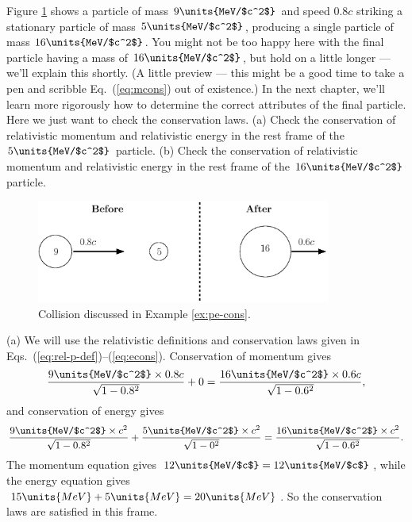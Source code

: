 \begin{example}{}
\label{ex:pe-cons}
Figure \ref{fig:junk} shows a particle of mass $9\units{MeV/$c^2$}$ and 
speed $0.8c$ striking a stationary particle of mass $5\units{MeV/$c^2$}$, 
producing a single particle of mass $16\units{MeV/$c^2$}$.
You might not be too happy here with the final particle having a mass
of $16\units{MeV/$c^2$}$, but hold on a little longer --- we'll
explain this shortly.  (A little preview --- this might be a good time
to take a pen and scribble Eq.~(\ref{eq:mcons}) out of existence.)  In
the next chapter, we'll learn more rigorously how to determine the
correct attributes of the final particle.  Here we just want to check
the conservation laws. (a) Check the conservation of relativistic
momentum and relativistic energy in the rest frame of the 
$5\units{MeV/$c^2$}$ particle.  (b) Check the conservation of
relativistic momentum and relativistic energy in the rest frame of the
$16\units{MeV/$c^2$}$ particle.
\begin{figure}[tb]
\begin{center}
\includegraphics[width=3.8in]{relativistic_momentum_and_energy/relpande3.eps}
\end{center}
\caption{Collision discussed in Example \ref{ex:pe-cons}.}
\label{fig:junk}
\end{figure}

\solution
(a) We will use the relativistic definitions and conservation laws given 
in Eqs.~(\ref{eq:rel-p-def})--(\ref{eq:econs}).  Conservation of momentum 
gives 
\begin{equation}
\frac{9\units{MeV/$c^2$}\times 0.8c}{\sqrt{1 - 0.8^2}} + 0 = 
\frac{16\units{MeV/$c^2$}\times 0.6c}{\sqrt{1 - 0.6^2}},
\end{equation}
and conservation of energy gives
\begin{equation}
\frac{9\units{MeV/$c^2$}\times c^2}{\sqrt{1 - 0.8^2}} 
 + \frac{5\units{MeV/$c^2$}\times c^2}{\sqrt{1 - 0^2}}= 
\frac{16\units{MeV/$c^2$}\times c^2}{\sqrt{1 - 0.6^2}}.
\end{equation}
The momentum equation gives $12\units{MeV/$c$} = 12\units{MeV/$c$}$, 
while the energy equation gives $15\units{MeV} + 5\units{MeV} = 20\units{MeV}$.
So the conservation laws are satisfied in this frame.


\end{example}
